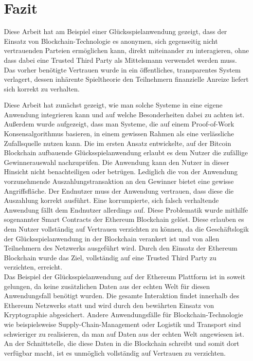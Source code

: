 \chapter{Fazit} %
Diese Arbeit hat am Beispiel einer Glücksspielanwendung gezeigt, dass der Einsatz von Blockchain-Technologie es anonymen, sich gegenseitig nicht vertrauenden Parteien ermöglichen kann, direkt miteinander zu interagieren, ohne dass dabei eine Trusted Third Party als Mittelsmann verwendet werden muss. Das vorher benötigte Vertrauen wurde in ein öffentliches, transparentes System verlagert, dessen inhärente Spieltheorie den Teilnehmern finanzielle Anreize liefert sich korrekt zu verhalten.

Diese Arbeit hat zunächst gezeigt, wie man solche Systeme in eine eigene Anwendung integrieren kann und auf welche Besonderheiten dabei zu achten ist. 
Außerdem wurde aufgezeigt, dass man Systeme, die auf einem Proof-of-Work Konsensalgorithmus basieren, in einem gewissen Rahmen als eine verlässliche Zufallsquelle nutzen kann. Die im ersten Ansatz entwickelte, auf der Bitcoin Blockchain aufbauende Glücksspielanwendung erlaubt es dem Nutzer die zufällige Gewinnerauswahl nachzuprüfen. Die Anwendung kann den Nutzer in dieser Hinsicht nicht benachteiligen oder betrügen. Lediglich die von der Anwendung vorzunehmende Auszahlungstransaktion an den Gewinner bietet eine gewisse Angriffsfläche. Der Endnutzer muss der Anwendung vertrauen, dass diese die Auszahlung korrekt ausführt. Eine korrumpierte, sich falsch verhaltende Anwendung fällt dem Endnutzer allerdings auf. 
Diese Problematik wurde mithilfe sogenannter Smart Contracts der Ethereum Blockchain gelöst. Diese erlauben es dem Nutzer vollständig auf Vertrauen verzichten zu können, da die Geschäftslogik der Glücksspielanwendung in der Blockchain verankert ist und von allen Teilnehmern des Netzwerks ausgeführt wird. Durch den Einsatz der Ethereum Blockchain wurde das Ziel, vollständig auf eine Trusted Third Party zu verzichten, erreicht.\\

\noindent Das Beispiel der Glücksspielanwendung auf der Ethereum Plattform ist in soweit gelungen, da keine zusätzlichen Daten aus der echten Welt für diesen Anwendungsfall benötigt wurden. Die gesamte Interaktion findet innerhalb des Ethereum Netzwerks statt und wird durch den bewährten Einsatz von Kryptographie abgesichert. Andere Anwendungsfälle für Blockchain-Technologie wie beispielsweise Supply-Chain-Management oder Logistik und Transport sind schwieriger zu realisieren, da man auf Daten aus der echten Welt angewiesen ist. An der Schnittstelle, die diese Daten in die Blockchain schreibt und somit dort verfügbar macht, ist es unmöglich vollständig auf Vertrauen zu verzichten.\\

